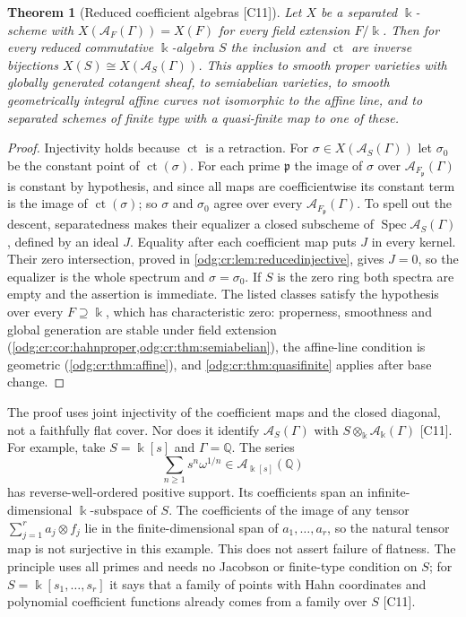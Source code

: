 \documentclass[11pt,oneside]{article}
\numberwithin{equation}{section}
\newtheorem{theorem}{Theorem}[section]
\theoremstyle{definition}
\theoremstyle{remark}
\newcommand{\Q}{\mathbb Q}
\newcommand{\ct}{\operatorname{ct}}
\newcommand{\src}[1]{\textup{\textsf{\small[#1]}}}
\newcommand{\crA}{\mathcal A_\Bbbk(\Gamma)}
\newcommand{\Spec}{\operatorname{Spec}}
\begin{document}
\begin{theorem}[Reduced coefficient algebras \src{C11}]\label{odg:cr:thm:reduced}
Let $X$ be a separated $\Bbbk$-scheme with $X(\mathcal A_F(\Gamma))=X(F)$ for every field
extension $F/\Bbbk$. Then for every reduced commutative $\Bbbk$-algebra $S$ the inclusion
and $\ct$ are inverse bijections $X(S)\cong X(\mathcal A_S(\Gamma))$. This applies to
smooth proper varieties with globally generated cotangent sheaf, to semiabelian
varieties, to smooth geometrically integral affine curves not isomorphic to the
affine line, and to separated schemes of finite type with a quasi-finite map to one
of these.
\end{theorem}
\begin{proof}
Injectivity holds because $\ct$ is a retraction. For $\sigma\in X(\mathcal A_S(\Gamma))$
let $\sigma_0$ be the constant point of $\ct(\sigma)$. For each prime $\mathfrak p$ the
image of $\sigma$ over $\mathcal A_{F_{\mathfrak p}}(\Gamma)$ is constant by hypothesis,
and since all maps are coefficientwise its constant term is the image of
$\ct(\sigma)$; so $\sigma$ and $\sigma_0$ agree over every
$\mathcal A_{F_{\mathfrak p}}(\Gamma)$. To spell out the descent,
separatedness makes their equalizer a closed subscheme of
$\Spec\mathcal A_S(\Gamma)$, defined by an ideal $J$. Equality after each
coefficient map puts $J$ in every kernel. Their zero intersection, proved
in \cref{odg:cr:lem:reducedinjective}, gives $J=0$, so the equalizer is the
whole spectrum and $\sigma=\sigma_0$. If $S$ is the zero ring both spectra
are empty and the assertion is immediate. The listed classes satisfy the hypothesis over every
$F\supseteq\Bbbk$, which has characteristic zero: properness, smoothness and global
generation are stable under field extension
(\cref{odg:cr:cor:hahnproper,odg:cr:thm:semiabelian}), the affine-line condition is
geometric (\cref{odg:cr:thm:affine}), and \cref{odg:cr:thm:quasifinite} applies after
base change.
\end{proof}

The proof uses joint injectivity of the coefficient maps and the closed
diagonal, not a faithfully flat cover. Nor does it identify
$\mathcal A_S(\Gamma)$ with $S\otimes_\Bbbk\crA$ \src{C11}.
For example, take $S=\Bbbk[s]$ and $\Gamma=\Q$. The series
\[
 \sum_{n\ge1}s^n\omega^{1/n}\in\mathcal A_{\Bbbk[s]}(\Q)
\]
has reverse-well-ordered positive support. Its coefficients span an
infinite-dimensional $\Bbbk$-subspace of $S$. The coefficients of the
image of any tensor $\sum_{j=1}^r a_j\otimes f_j$ lie in the
finite-dimensional span of $a_1,\ldots,a_r$, so the natural tensor map
is not surjective in this example. This does not assert failure of
flatness. The principle uses all primes and needs no Jacobson or
finite-type condition on $S$; for $S=\Bbbk[s_1,\ldots,s_r]$ it says that a family of
points with Hahn coordinates and polynomial coefficient functions already comes from
a family over $S$ \src{C11}.
\end{document}
